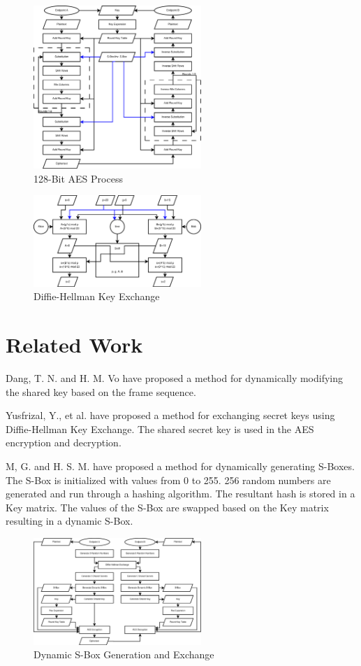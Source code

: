\documentclass[journal]{IEEEtran}
\begin{document}
\begin{figure}[!t]
	\centering
	\includegraphics[width=2.5in]{AESProcess}
	\caption{128-Bit AES Process}
	\label{Figure:AESProcess}
\end{figure}
\begin{figure}[!t]
	\centering
	\includegraphics[width=2.5in]{DiffieHellman}
	\caption{Diffie-Hellman Key Exchange}
	\label{Figure:DiffieHellman}
\end{figure}

\section{Related Work}

\cite{AESDynamicKey} Dang, T. N. and H. M. Vo have proposed a method for dynamically modifying the 
shared key based on the frame sequence.

\cite{AESDiffieHellman} Yusfrizal, Y., et al. have proposed a method for exchanging secret keys using
Diffie-Hellman Key Exchange. The shared secret key is used in the AES encryption and decryption.

\cite{AESDynamicSBox} M, G. and H. S. M. have proposed a method for dynamically generating S-Boxes. 
The S-Box is initialized with values from 0 to 255. 256 random numbers are generated and run through 
a hashing algorithm. The resultant hash is stored in a Key matrix. The values of the S-Box are swapped 
based on the Key matrix resulting in a dynamic S-Box. 

\begin{figure}[!t]
	\centering
	\includegraphics[width=2.5in]{AESDynamicSBox}
	\caption{Dynamic S-Box Generation and Exchange}
	\label{Figure:DynamicSBoxExchange}
\end{figure}
\end{document}

